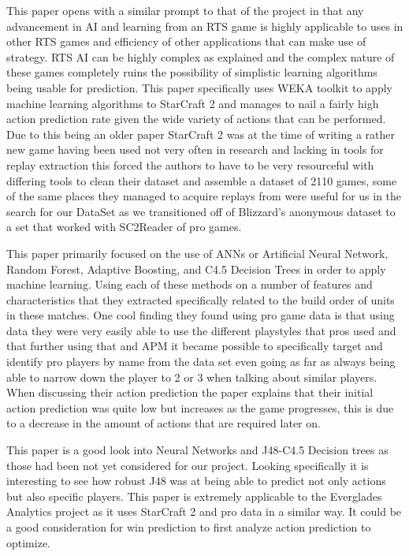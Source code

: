 \documentclass[a4paper,12pt]{report}
\begin{document}
This paper opens with a similar prompt to that of the project in that any advancement in AI and learning from an RTS game is highly applicable to uses in other RTS games and efficiency of other applications that can make use of strategy. RTS AI can be highly complex as explained and the complex nature of these games completely ruins the possibility of simplistic learning algorithms being usable for prediction. This paper specifically uses WEKA toolkit to apply machine learning algorithms to StarCraft 2 and manages to nail a fairly high action prediction rate given the wide variety of actions that can be performed. Due to this being an older paper StarCraft 2 was at the time of writing a rather new game having been used not very often in research and lacking in tools for replay extraction this forced the authors to have to be very resourceful with differing tools to clean their dataset and assemble a dataset of 2110 games, some of the same places they managed to acquire replays from were useful for us in the search for our DataSet as we transitioned off of Blizzard’s anonymous dataset to a set that worked with SC2Reader of pro games. 

This paper primarily focused on the use of ANNs or Artificial Neural Network, Random Forest, Adaptive Boosting, and C4.5 Decision Trees in order to apply machine learning. Using each of these methods on a number of features and characteristics that they extracted specifically related to the build order of units in these matches. One cool finding they found using pro game data is that using data they were very easily able to use the different playstyles that pros used and that further using that and APM it became possible to specifically target and identify pro players by name from the data set even going as far as always being able to narrow down the player to 2 or 3 when talking about similar players. When discussing their action prediction the paper explains that their initial action prediction was quite low but increases as the game progresses, this is due to a decrease in the amount of actions that are required later on.

This paper is a good look into Neural Networks and J48-C4.5 Decision trees as those had been not yet considered for our project. Looking specifically it is interesting to see how robust J48 was at being able to predict not only actions but also specific players. This paper is extremely applicable to the Everglades Analytics project as it uses StarCraft 2 and pro data in a similar way. It could be a good consideration for win prediction to first analyze action prediction to optimize.
\end{document}

